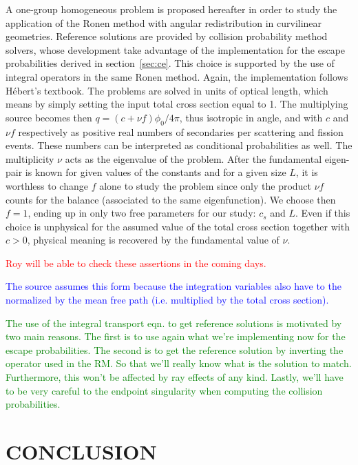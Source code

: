 \documentclass{ictt26}
\begin{document}
A one-group homogeneous problem is proposed hereafter in order to study the application of the Ronen method with angular redistribution in curvilinear geometries. Reference solutions are provided by collision probability method solvers, whose development take advantage of the implementation for the escape probabilities derived in section~\ref{sec:ce}. This choice is supported by the use of integral operators in the same Ronen method. Again, the implementation follows H\'ebert's textbook. The problems are solved in units of optical length, which means by simply setting the input total cross section equal to 1. The multiplying source becomes then $q = (c + \nu f) \phi_0 / 4\pi$, thus isotropic in angle, and with $c$ and $\nu f$ respectively as positive real numbers of secondaries per scattering and fission events. These numbers can be interpreted as conditional probabilities as well. The multiplicity $\nu$ acts as the eigenvalue of the problem. After the fundamental eigen-pair is known for given values of the constants and for a given size $L$, it is worthless to change $f$ alone to study the problem since only the product $\nu f$ counts for the balance (associated to the same eigenfunction). We choose then $f = 1$, ending up in only two free parameters for our study: $c_s$ and $L$. Even if this choice is unphysical for the assumed value of the total cross section together with $c > 0$, physical meaning is recovered by the fundamental value of $\nu$.

\textcolor{red}{Roy will be able to check these assertions in the coming days.}

\textcolor{blue}{The source assumes this form because the integration variables also have to the normalized by the mean free path (i.e. multiplied by the total cross section).}

\textcolor{green}{The use of the integral transport eqn. to get reference solutions is motivated by two main reasons. The first is to use again what we're implementing now for the escape probabilities. The second is to get the reference solution by inverting the operator used in the RM. So that we'll really know what is the solution to match. Furthermore, this won't be affected by ray effects of any kind. Lastly, we'll have to be very careful to the endpoint singularity when computing the collision probabilities.}

\section{CONCLUSION}
\label{sec:cncls}
\end{document}
